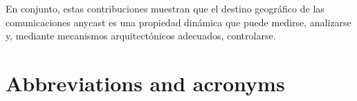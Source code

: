\documentclass[
A4paper,                %
twoside,                %
openright,              %
chapterprefix=true,     %
12pt,                   %
headings=normal,        %
titlepage=on            %
]{book}
\begin{document}
En conjunto, estas contribuciones muestran que el destino geográfico de las comunicaciones anycast es una propiedad dinámica que puede medirse, analizarse y, mediante mecanismos arquitectónicos adecuados, controlarse.
\newpage


\setcounter{tocdepth}{3}		%
\tableofcontents				%


\listoffigures


\newpage

%
\section*{Abbreviations and acronyms}
\label{sec::acronyns}
\end{document}
